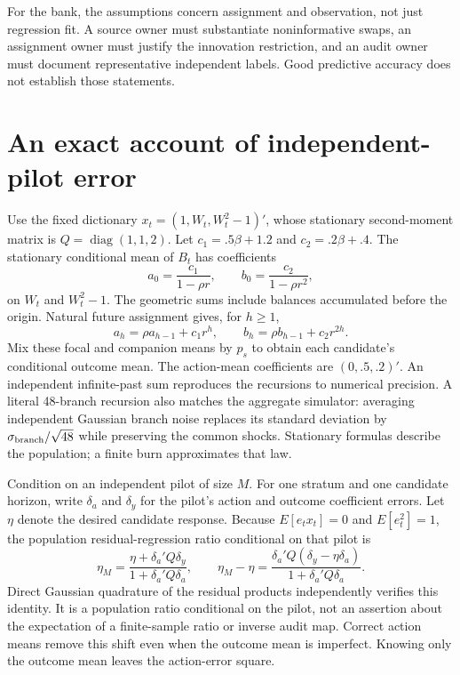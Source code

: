For the bank, the assumptions concern assignment and observation, not just
regression fit. A source owner must substantiate noninformative swaps, an
assignment owner must justify the innovation restriction, and an audit owner
must document representative independent labels. Good predictive accuracy
does not establish those statements.

\section{An exact account of independent-pilot error}
\label{v9:pilot}

Use the fixed dictionary $x_t=(1,W_t,W_t^2-1)'$, whose stationary second-moment
matrix is $Q=\operatorname{diag}(1,1,2)$. Let
$c_1=.5\beta+1.2$ and $c_2=.2\beta+.4$. The stationary conditional mean of
$B_t$ has coefficients
\[
 a_0=\frac{c_1}{1-\rho r},\qquad
 b_0=\frac{c_2}{1-\rho r^2},
\]
on $W_t$ and $W_t^2-1$. The geometric sums include balances accumulated before
the origin. Natural future assignment gives, for $h\geq1$,
\[
 a_h=\rho a_{h-1}+c_1r^h,\qquad
 b_h=\rho b_{h-1}+c_2r^{2h}.
\]
Mix these focal and companion means by $p_s$ to obtain each candidate's
conditional outcome mean. The action-mean coefficients are $(0,.5,.2)'$.
An independent infinite-past sum reproduces the recursions to numerical
precision. A literal 48-branch recursion also matches the aggregate simulator:
averaging independent Gaussian branch noise replaces its standard deviation
by $\sigma_{\rm branch}/\sqrt{48}$ while preserving the common shocks.
Stationary formulas describe the population; a finite burn approximates that law.

Condition on an independent pilot of size $M$. For one stratum and one
candidate horizon, write $\delta_a$ and $\delta_y$ for the pilot's action and
outcome coefficient errors. Let $\eta$ denote the desired candidate response.
Because $E[e_tx_t]=0$ and $E[e_t^2]=1$, the population residual-regression ratio
conditional on that pilot is
\begin{equation}
 \eta_M=\frac{\eta+\delta_a'Q\delta_y}
                    {1+\delta_a'Q\delta_a},\qquad
 \eta_M-\eta=
 \frac{\delta_a'Q(\delta_y-\eta\delta_a)}
      {1+\delta_a'Q\delta_a}. \label{v9:pilot-bias}
\end{equation}
Direct Gaussian quadrature of the residual products independently verifies
this identity. It is a population ratio conditional on the pilot, not an
assertion about the expectation of a finite-sample ratio or inverse audit map.
Correct action means remove this shift even when the outcome mean is
imperfect. Knowing only the outcome mean leaves the action-error square.

